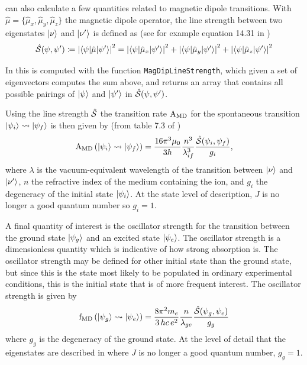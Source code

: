 \documentclass{article}
\newcommand{\codetext}[1]{{\color{BlueViolet} \texttt{#1}}}
\begin{document}
\qlanth can also calculate a few quantities related to magnetic dipole transitions. With $\hat{\mu} = \{\hat{\mu}_x, \hat{\mu}_y, \hat{\mu}_z\}$ the magnetic dipole operator, the line strength between two eigenstates $|\nu\rangle$ and $|\nu'\rangle$ is defined as (see for example equation 14.31 in \cite{cowan_theory_1981})
\begin{equation}
	\hat{\mathcal{S}}(\psi,\psi') \coloneqq \left| \langle \psi|\hat{\mu}|\psi'\rangle \right|^2 = \left| \langle \psi|\hat{\mu}_x|\psi'\rangle \right|^2 + \left| \langle \psi|\hat{\mu}_y|\psi'\rangle \right|^2 + \left| \langle \psi|\hat{\mu}_z|\psi'\rangle \right|^2
\end{equation}

In \qlanth this is computed with the function \codetext{MagDipLineStrength}, which given a set of eigenvectors computes the sum above, and returns an array that contains all possible pairings of $|\psi\rangle$ and $|\psi'\rangle$ in $\hat{\mathcal{S}}(\psi,\psi')$.
 


Using the line strength $\hat{\mathcal{S}}$ the transition rate $\text{A}_\text{MD}$ for the spontaneous transition $|\psi_i\rangle \rightsquigarrow |\psi_f\rangle$ is then given by (from table 7.3 of \cite{thorne_spectrophysics_1999})
\begin{equation}
	\text{A}_\text{MD}\left(|\psi_i\rangle \rightsquigarrow |\psi_f\rangle\right) = \frac{16 \pi^3 \mu_0}{3 h} \frac{n^3}{\lambda_{if}^3} \frac{\hat{\mathcal{S}}(\psi_i,\psi_f)}{g_i},
\end{equation}
where $\lambda$ is the vacuum-equivalent wavelength of the transition between $|\nu\rangle$ and $|\nu'\rangle$, $n$ the refractive index of the medium containing the ion, and $g_i$ the degeneracy of the initial state $|\psi_i\rangle$. At the state level of description, $J$ is no longer a good quantum number so $g_i=1$.

 
 
A final quantity of interest is the oscillator strength for the transition between the ground state $|\psi_g\rangle$ and an excited state $|\psi_e\rangle$. The oscillator strength is a dimensionless quantity which is indicative of how strong absorption is. The oscillator strength may be defined for other initial state than the ground state, but since this is the state most likely to be populated in ordinary experimental conditions, this is the initial state that is of more frequent interest. The oscillator strength is given by \cite{carnall_spectral_1965}
\begin{equation}
	\text{f}_\text{MD}\left(|\psi_g\rangle \rightsquigarrow |\psi_e\rangle\right) = \frac{8 \pi^2 m_{e}}{3\,hc\,e^2} 
	\frac{n}{\lambda_{ge}}
	\frac{\hat{\mathcal{S}}(\psi_g,\psi_e)}{g_g}
\end{equation}
where $g_g$ is the degeneracy of the ground state. At the level of detail that the eigenstates are described in \qlanth where $J$ is no longer a good quantum number, $g_g = 1$. 
\end{document}
